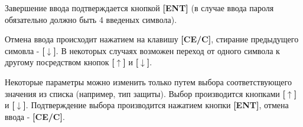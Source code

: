 Завершение ввода подтверждается кнопкой \textbf{[ENT]} (в случае ввода пароля обязательно должно быть 4 введеных символа).

Отмена ввода происходит нажатием на клавишу \textbf{[CE/C]}, стирание предыдущего симовла - \textbf{[$\downarrow$]}. В некоторых случаях возможен переход от одного символа к другому посредством кнопок \textbf{[$\uparrow$]} и \textbf{[$\downarrow$]}.

Некоторые параметры можно изменить только путем выбора соответствующего значения из списка (например, тип защиты). Выбор производится кнопками \textbf{[$\uparrow$]} и \textbf{[$\downarrow$]}. Подтверждение выбора производится нажатием кнопки \textbf{[ENT]}, отмена ввода - \textbf{[CE/C]}.
